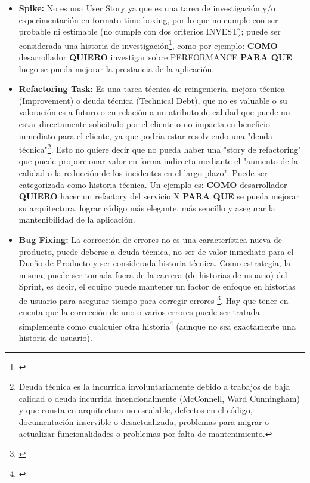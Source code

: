 \begin{itemize}
Para la Agile Alliance una Story no se corresponde en general a un "componente técnico" o de la "interfaz de usuario", pues a pesar de que a veces puede ser un atajo útil hablar de por ejemplo "la historia de diálogo de búsqueda", pantallas, cuadros de diálogo y botones, no son historias de usuario \footnote{\cite{Scrum-Alliance-2015}}.

\item \textbf{Spike:}
No es una User Story ya que es una tarea de investigación y/o experimentación en formato time-boxing, por lo que no cumple con ser probable ni estimable (no cumple con dos criterios INVEST); puede ser considerada una historia de investigación\footnote{\cite{Cohn-2004}}, como por ejemplo: \textbf{COMO} desarrollador \textbf{QUIERO} investigar sobre PERFORMANCE \textbf{PARA QUE} luego se pueda mejorar la prestancia de la aplicación.\newline

\item \textbf{Refactoring Task:}
Es una tarea técnica de reingeniería, mejora técnica (Improvement) o deuda técnica (Technical Debt), que no es valuable o su valoración es a futuro o en relación a un atributo de calidad que puede no estar directamente solicitado por el cliente o no impacta en beneficio inmediato para el cliente, ya que podría estar resolviendo una "deuda técnica"\footnote{Deuda técnica es la incurrida involuntariamente debido a trabajos de baja calidad o deuda incurrida intencionalmente (McConnell, Ward Cunningham) y que consta en arquitectura no escalable, defectos en el código, documentación inservible o desactualizada, problemas para migrar o actualizar funcionalidades o problemas por falta de mantenimiento.}. Esto no quiere decir que no pueda haber una "story de refactoring" que puede proporcionar valor en forma indirecta mediante el "aumento de la calidad o la reducción de los incidentes en el largo plazo". Puede ser categorizada como historia técnica.
Un ejemplo es: \textbf{COMO} desarrollador \textbf{QUIERO} hacer un refactory del servicio X \textbf{PARA QUE} se pueda mejorar su arquitectura, lograr código más elegante, más sencillo y asegurar la mantenibilidad de la aplicación.\newline

\item \textbf{Bug Fixing:} La corrección de errores no es una característica nueva de producto, puede deberse a deuda técnica, no ser de valor inmediato para el Dueño de Producto y ser considerada historia técnica. Como estrategia, la misma, puede ser tomada fuera de la carrera (de historias de usuario) del Sprint, es decir, el equipo puede mantener un factor de enfoque en historias de usuario para asegurar tiempo para corregir errores \footnote{\cite{Henrik-Kniberg-2007}}. Hay que tener en cuenta que la corrección de uno o varios errores puede ser tratada simplemente como cualquier otra historia\footnote{\cite{Cohn-2004}} (aunque no sea exactamente una historia de usuario).\newline

\end{itemize}

